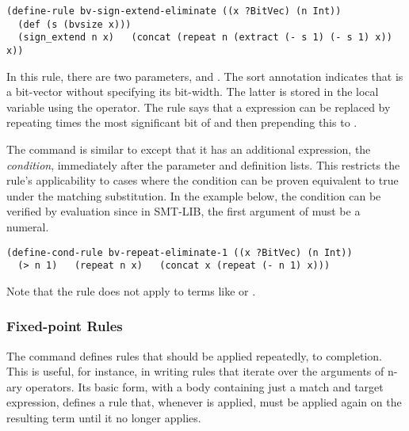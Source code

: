 \begin{lstlisting}[language=rare]
(define-rule bv-sign-extend-eliminate ((x ?BitVec) (n Int))
  (def (s (bvsize x)))
  (sign_extend n x)   (concat (repeat n (extract (- s 1) (- s 1) x)) x))
\end{lstlisting}

\noindent
In this rule, there are two parameters, 
and .
The sort annotation  indicates that 
is a bit-vector without specifying its bit-width.
%
The latter is stored in the local variable  
using the  operator.  
The rule says that a  expression can be replaced
by repeating  times the most significant bit of 
and then prepending this to .

The  command is similar to  except that
it has an additional expression, the \textit{condition}, immediately after the
parameter and definition lists. This restricts the rule's applicability
to cases where the condition can be proven equivalent to true under the
matching substitution. 
In the example below, the condition  can be verified by evaluation 
since in SMT-LIB, the first argument of  must be a numeral.  

\begin{lstlisting}[language=rare]
(define-cond-rule bv-repeat-eliminate-1 ((x ?BitVec) (n Int))
  (> n 1)   (repeat n x)   (concat x (repeat (- n 1) x)))
\end{lstlisting}
%
Note that the rule does not apply to terms like  
or .

\subsubsection{Fixed-point Rules}

The  command defines rules that
should be applied repeatedly, to completion.
%
This is useful, for instance, in writing rules that iterate over
the arguments of n-ary operators.  Its basic form, 
with a body containing just a match and target expression, 
defines a rule that, whenever is applied, must be applied again 
on the resulting term until it no longer applies.

